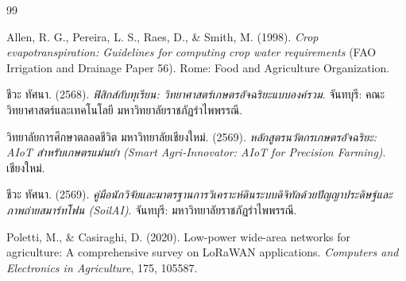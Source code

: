 \begin{thebibliography}{99}

Allen, R. G., Pereira, L. S., Raes, D., \& Smith, M. (1998). \textit{Crop evapotranspiration: Guidelines for computing crop water requirements} (FAO Irrigation and Drainage Paper 56). Rome: Food and Agriculture Organization.

ชีวะ ทัศนา. (2568). \textit{ฟิสิกส์กับทุเรียน: วิทยาศาสตร์เกษตรอัจฉริยะแบบองค์รวม}. จันทบุรี: คณะวิทยาศาสตร์และเทคโนโลยี มหาวิทยาลัยราชภัฏรำไพพรรณี.

วิทยาลัยการศึกษาตลอดชีวิต มหาวิทยาลัยเชียงใหม่. (2569). \textit{หลักสูตรนวัตกรเกษตรอัจฉริยะ: AIoT สำหรับเกษตรแม่นยำ (Smart Agri-Innovator: AIoT for Precision Farming)}. เชียงใหม่.

ชีวะ ทัศนา. (2569). \textit{คู่มือนักวิจัยและมาตรฐานการวิเคราะห์ดินระบบดิจิทัลด้วยปัญญาประดิษฐ์และภาพถ่ายสมาร์ทโฟน (SoilAI)}. จันทบุรี: มหาวิทยาลัยราชภัฏรำไพพรรณี.

Poletti, M., \& Casiraghi, D. (2020). Low-power wide-area networks for agriculture: A comprehensive survey on LoRaWAN applications. \textit{Computers and Electronics in Agriculture}, 175, 105587.

\end{thebibliography}

